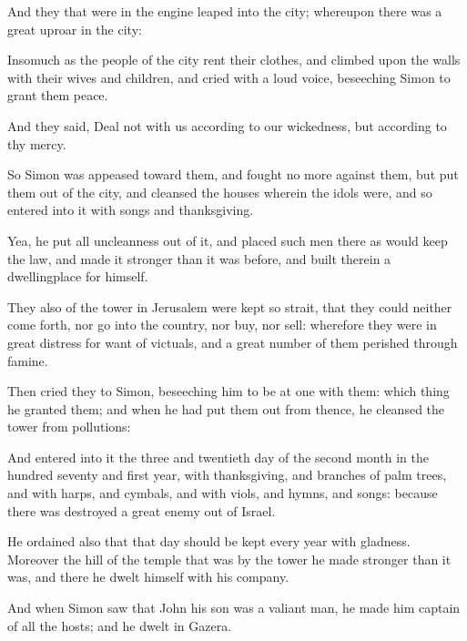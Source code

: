 {\par }{\PP {}And they that were in the engine leaped into the city; whereupon there was a great uproar in the city:
\par }{\PP {}Insomuch as the people of the city rent their clothes, and climbed upon the walls with their wives and children, and cried with a loud voice, beseeching Simon to grant them peace.
\par }{\PP {}And they said, Deal not with us according to our wickedness, but according to thy mercy.
\par }{\PP {}So Simon was appeased toward them, and fought no more against them, but put them out of the city, and cleansed the houses wherein the idols were, and so entered into it with songs and thanksgiving.
\par }{\PP {}Yea, he put all uncleanness out of it, and placed such men there as would keep the law, and made it stronger than it was before, and built therein a dwellingplace for himself.
\par }{\PP {}They also of the tower in Jerusalem were kept so strait, that they could neither come forth, nor go into the country, nor buy, nor sell: wherefore they were in great distress for want of victuals, and a great number of them perished through famine.
\par }{\PP {}Then cried they to Simon, beseeching him to be at one with them: which thing he granted them; and when he had put them out from thence, he cleansed the tower from pollutions:
\par }{\PP {}And entered into it the three and twentieth day of the second month in the hundred seventy and first year, with thanksgiving, and branches of palm trees, and with harps, and cymbals, and with viols, and hymns, and songs: because there was destroyed a great enemy out of Israel.
\par }{\PP {}He ordained also that that day should be kept every year with gladness. Moreover the hill of the temple that was by the tower he made stronger than it was, and there he dwelt himself with his company.
\par }{\PP {}And when Simon saw that John his son was a valiant man, he made him captain of all the hosts; and he dwelt in Gazera.

}

